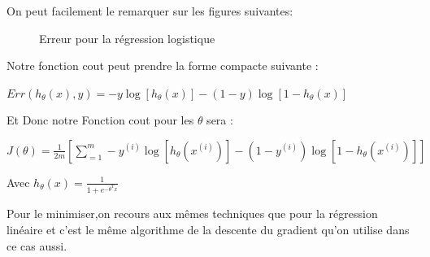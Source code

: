 On peut facilement le remarquer sur les figures suivantes: \\
\begin{figure}[ht]
	\centering
	\hfill
	\hfill
	\caption{Erreur  pour la régression logistique}
\end{figure}
Notre fonction cout peut prendre la forme compacte suivante :
\begin{center}
	$Err({h}_{\theta}\left(x\right),y) = -y\log [{h}_{\theta}\left(x\right)] -(1-y)\log [1-{h}_{\theta}\left(x\right)]$ 
\end{center}	
Et Donc notre Fonction cout pour les $\theta$ sera :
\begin{center}
$J\left({\theta }\right)=\frac{1}{2m}[\sum _{=1}^{m}-{y}^{(i)}\log [{h}_{\theta}\left({x}^{(i)}\right)] -(1-{y}^{(i)})\log [1-{h}_{\theta}\left({x}^{(i)}\right)]]$
\end{center}

Avec ${h}_{\theta}\left(x\right) =\frac{1}{1+{e}^{-{\theta }^{T}{x}}}$

 Pour le minimiser,on recours aux mêmes techniques que pour la régression linéaire et c'est le même algorithme de la descente du gradient qu'on utilise  dans ce cas aussi.
